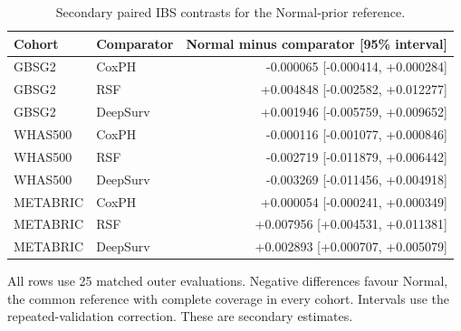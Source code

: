 \begin{table}[htbp]
\centering
\small
\caption{Secondary paired IBS contrasts for the Normal-prior reference.}
\label{tab:report-secondary}
\begin{tabular}{@{}llr@{}}
\toprule
Cohort & Comparator & Normal minus comparator [95\% interval]\\
\midrule
GBSG2 & CoxPH & -0.000065 [-0.000414, +0.000284]\\
GBSG2 & RSF & +0.004848 [-0.002582, +0.012277]\\
GBSG2 & DeepSurv & +0.001946 [-0.005759, +0.009652]\\
WHAS500 & CoxPH & -0.000116 [-0.001077, +0.000846]\\
WHAS500 & RSF & -0.002719 [-0.011879, +0.006442]\\
WHAS500 & DeepSurv & -0.003269 [-0.011456, +0.004918]\\
METABRIC & CoxPH & +0.000054 [-0.000241, +0.000349]\\
METABRIC & RSF & +0.007956 [+0.004531, +0.011381]\\
METABRIC & DeepSurv & +0.002893 [+0.000707, +0.005079]\\
\bottomrule
\end{tabular}
\par\smallskip
\begin{minipage}{\textwidth}\footnotesize All rows use 25 matched outer evaluations. Negative differences favour Normal, the common reference with complete coverage in every cohort. Intervals use the repeated-validation correction. These are secondary estimates.\end{minipage}
\end{table}
